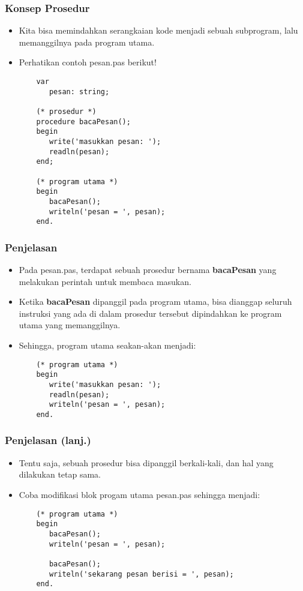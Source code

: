 \documentclass{beamer}
\begin{document}
\begin{frame}[fragile]
\frametitle{Konsep Prosedur}
\begin{itemize}
	\item Kita bisa memindahkan serangkaian kode menjadi sebuah subprogram, lalu memanggilnya pada program utama.
	\item Perhatikan contoh pesan.pas berikut!
	\begin{lstlisting}
	var
	   pesan: string;
	
	(* prosedur *)
	procedure bacaPesan();
	begin
	   write('masukkan pesan: ');
	   readln(pesan);
	end;
	
	(* program utama *)
	begin
	   bacaPesan();
	   writeln('pesan = ', pesan);
	end.
	\end{lstlisting}
\end{itemize}
\end{frame}

\begin{frame}[fragile]
\frametitle{Penjelasan}
\begin{itemize}
	\item Pada pesan.pas, terdapat sebuah prosedur bernama \textbf{bacaPesan} yang melakukan perintah untuk membaca masukan.
	\item Ketika \textbf{bacaPesan} dipanggil pada program utama, bisa dianggap seluruh instruksi yang ada di dalam prosedur tersebut dipindahkan ke program utama yang memanggilnya.
	\item Sehingga, program utama seakan-akan menjadi:
	\begin{lstlisting}
	(* program utama *)
	begin
	   write('masukkan pesan: ');
	   readln(pesan);
	   writeln('pesan = ', pesan);
	end.
	\end{lstlisting}
\end{itemize}
\end{frame}

\begin{frame}[fragile]
\frametitle{Penjelasan (lanj.)}
\begin{itemize}
	\item Tentu saja, sebuah prosedur bisa dipanggil berkali-kali, dan hal yang dilakukan tetap sama.
	\item Coba modifikasi blok progam utama pesan.pas sehingga menjadi:
	\begin{lstlisting}
	(* program utama *)
	begin
	   bacaPesan();
	   writeln('pesan = ', pesan);
	   
	   bacaPesan();
	   writeln('sekarang pesan berisi = ', pesan);
	end.
	\end{lstlisting}
\end{itemize}
\end{frame}
\end{document}
